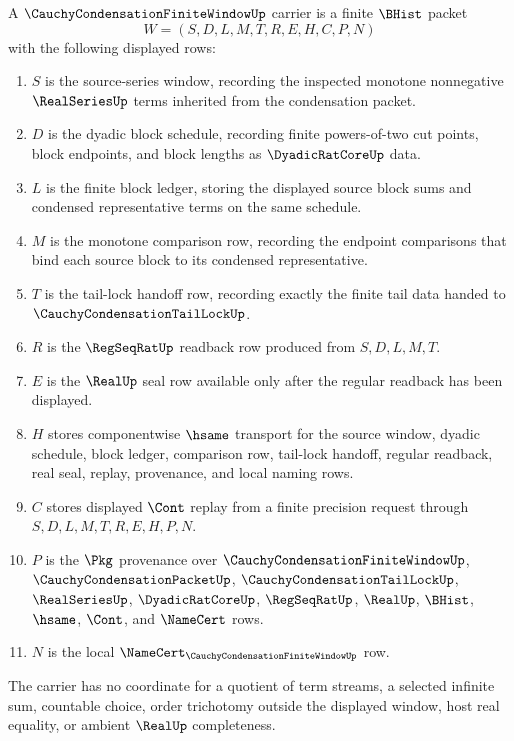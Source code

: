 \begin{definition}
\label{def:cauchy-condensation-finite-window-carrier}
A $\CauchyCondensationFiniteWindowUp$ carrier is a finite $\BHist$ packet
$$
W=(S,D,L,M,T,R,E,H,C,P,N)
$$
with the following displayed rows:
\begin{enumerate}
\item $S$ is the source-series window, recording the inspected monotone nonnegative $\RealSeriesUp$ terms inherited from the condensation packet.
\item $D$ is the dyadic block schedule, recording finite powers-of-two cut points, block endpoints, and block lengths as $\DyadicRatCoreUp$ data.
\item $L$ is the finite block ledger, storing the displayed source block sums and condensed representative terms on the same schedule.
\item $M$ is the monotone comparison row, recording the endpoint comparisons that bind each source block to its condensed representative.
\item $T$ is the tail-lock handoff row, recording exactly the finite tail data handed to $\CauchyCondensationTailLockUp$.
\item $R$ is the $\RegSeqRatUp$ readback row produced from $S,D,L,M,T$.
\item $E$ is the $\RealUp$ seal row available only after the regular readback has been displayed.
\item $H$ stores componentwise $\hsame$ transport for the source window, dyadic schedule, block ledger, comparison row, tail-lock handoff, regular readback, real seal, replay, provenance, and local naming rows.
\item $C$ stores displayed $\Cont$ replay from a finite precision request through $S,D,L,M,T,R,E,H,P,N$.
\item $P$ is the $\Pkg$ provenance over $\CauchyCondensationFiniteWindowUp$, $\CauchyCondensationPacketUp$, $\CauchyCondensationTailLockUp$, $\RealSeriesUp$, $\DyadicRatCoreUp$, $\RegSeqRatUp$, $\RealUp$, $\BHist$, $\hsame$, $\Cont$, and $\NameCert$ rows.
\item $N$ is the local $\NameCert_{\CauchyCondensationFiniteWindowUp}$ row.
\end{enumerate}
The carrier has no coordinate for a quotient of term streams, a selected infinite sum, countable choice, order trichotomy outside the displayed window, host real equality, or ambient $\RealUp$ completeness.
\end{definition}

